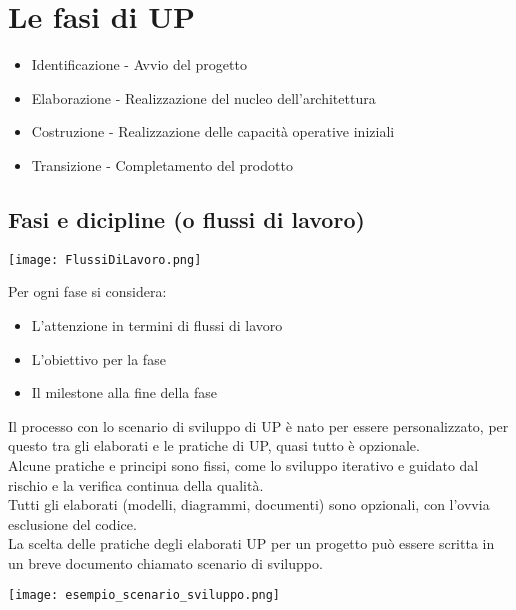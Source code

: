  \section{Le fasi di UP}
 \begin{itemize}
    \item Identificazione - Avvio del progetto
    \item Elaborazione - Realizzazione del nucleo dell'architettura
    \item Costruzione - Realizzazione delle capacità operative iniziali
    \item Transizione - Completamento del prodotto
 \end{itemize}
\subsection{Fasi e dicipline (o flussi di lavoro)}
\begin{center}
    \texttt{[image: FlussiDiLavoro.png]}
\end{center}
Per ogni fase si considera:
\begin{itemize}
    \item L'attenzione in termini di flussi di lavoro
    \item L'obiettivo per la fase
    \item Il milestone alla fine della fase
\end{itemize}
Il processo con lo scenario di sviluppo di UP è nato per essere personalizzato,
per questo tra gli elaborati e le pratiche di UP, quasi tutto è opzionale.
\\ Alcune pratiche e principi sono fissi, come lo sviluppo iterativo e guidato dal rischio
e la verifica continua della qualità.
\\ Tutti gli elaborati (modelli, diagrammi, documenti) sono opzionali, con l'ovvia
esclusione del codice.
\\ La scelta delle pratiche degli elaborati UP per un progetto può essere scritta in un
breve documento chiamato scenario di sviluppo.
\begin{center}
    \texttt{[image: esempio\_scenario\_sviluppo.png]}
\end{center}
